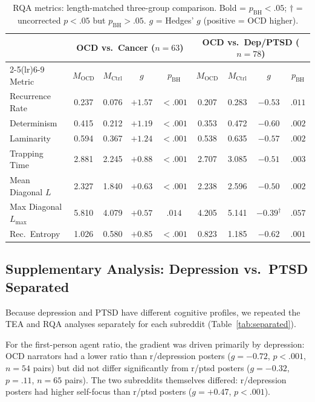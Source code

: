 \documentclass[11pt,a4paper]{article}
\begin{document}
\begin{table}[t]
\centering
\caption{RQA metrics: length-matched three-group comparison. Bold = $p_\mathrm{BH} < .05$; $\dagger$ = uncorrected $p < .05$ but $p_\mathrm{BH} > .05$. $g$ = Hedges' $g$ (positive = OCD higher).}
\label{tab:rqa}
\small
\begin{tabular}{@{}l cccc cccc@{}}
\toprule
 & \multicolumn{4}{c}{\textbf{OCD vs.\ Cancer} ($n=63$)} & \multicolumn{4}{c}{\textbf{OCD vs.\ Dep/PTSD} ($n=78$)} \\
\cmidrule(lr){2-5}\cmidrule(lr){6-9}
Metric & $M_\mathrm{OCD}$ & $M_\mathrm{Ctrl}$ & $g$ & $p_\mathrm{BH}$ & $M_\mathrm{OCD}$ & $M_\mathrm{Ctrl}$ & $g$ & $p_\mathrm{BH}$ \\
\midrule
Recurrence Rate     & 0.237 & 0.076 & $\mathbf{+1.57}$ & ${<}.001$ & 0.207 & 0.283 & $\mathbf{-0.53}$ & $.011$ \\
Determinism         & 0.415 & 0.212 & $\mathbf{+1.19}$ & ${<}.001$ & 0.353 & 0.472 & $\mathbf{-0.60}$ & $.002$ \\
Laminarity          & 0.594 & 0.367 & $\mathbf{+1.24}$ & ${<}.001$ & 0.538 & 0.635 & $\mathbf{-0.57}$ & $.002$ \\
Trapping Time       & 2.881 & 2.245 & $\mathbf{+0.88}$ & ${<}.001$ & 2.707 & 3.085 & $\mathbf{-0.51}$ & $.003$ \\
Mean Diagonal $L$   & 2.327 & 1.840 & $\mathbf{+0.63}$ & ${<}.001$ & 2.238 & 2.596 & $\mathbf{-0.50}$ & $.002$ \\
Max Diagonal $L_\mathrm{max}$ & 5.810 & 4.079 & $\mathbf{+0.57}$ & $.014$ & 4.205 & 5.141 & $-0.39^\dagger$ & $.057$ \\
Rec.\ Entropy       & 1.026 & 0.580 & $\mathbf{+0.85}$ & ${<}.001$ & 0.823 & 1.185 & $\mathbf{-0.62}$ & $.001$ \\
\bottomrule
\end{tabular}
\end{table}

\subsection{Supplementary Analysis: Depression vs.\ PTSD Separated}

Because depression and PTSD have different cognitive profiles, we repeated the TEA and RQA analyses separately for each subreddit (Table~\ref{tab:separated}).

For the first-person agent ratio, the gradient was driven primarily by depression: OCD narrators had a lower ratio than r/depression posters ($g = -0.72$, $p < .001$, $n = 54$ pairs) but did not differ significantly from r/ptsd posters ($g = -0.32$, $p = .11$, $n = 65$ pairs). The two subreddits themselves differed: r/depression posters had higher self-focus than r/ptsd posters ($g = +0.47$, $p < .001$).
\end{document}
